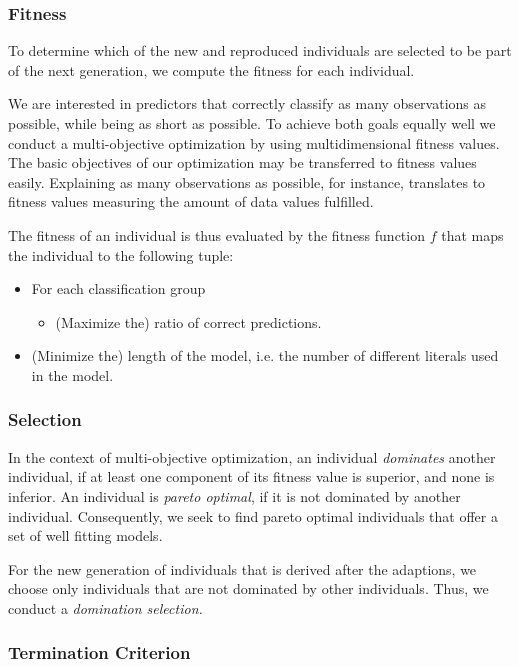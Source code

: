 \documentclass[dvipsnames,format=sigconf,anonymous=false,review=false]{acmart}
\begin{document}
  
  \subsubsection{Fitness}


  To determine which of the new and reproduced individuals are selected to be part of the next generation,
  we compute the fitness for each individual.
  
  We are interested in predictors that correctly classify as many observations as
  possible, while being as short as possible. To achieve both goals
  equally well we conduct a multi-objective optimization by using multidimensional
  fitness values. The basic objectives of our optimization may
  be transferred to fitness values easily. Explaining as many observations as possible,
  for instance, translates to fitness values measuring the amount of
  data values fulfilled.
  
  The fitness of an individual is thus
evaluated by the fitness function
$f$ that maps the individual to the following tuple:

\begin{itemize}  
\item For each classification group
\begin{itemize}
  \item (Maximize the) ratio of correct predictions.
\end{itemize}
\item (Minimize the) length of the model, i.e. the number of
different literals used in the model.
\end{itemize}

\subsubsection{Selection}

  In the context of multi-objective optimization,
  an individual \emph{dominates} another individual, if at least one
  component of its fitness
  value is superior, and none is inferior. An individual is \emph{pareto
  optimal}, if it is not dominated by another individual. Consequently, we seek to
  find pareto optimal individuals that offer a set of well fitting models.
  
  For the new generation of individuals
  that is derived after the adaptions, we choose only individuals that
  are not dominated by other individuals. Thus, we conduct a \emph{domination
  selection.} 
  
  \subsubsection{Termination Criterion}
\end{document}
